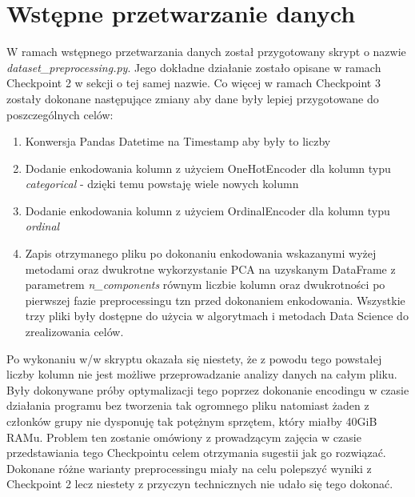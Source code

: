 \documentclass{classrep}
\begin{document}
    \section{Wstępne przetwarzanie danych} {
        W ramach wstępnego przetwarzania danych został przygotowany skrypt o nazwie
        \textit{dataset\_preprocessing.py}. Jego dokładne działanie zostało opisane w
        ramach Checkpoint 2 w sekcji o tej samej nazwie. Co więcej w ramach Checkpoint 3 zostały dokonane następujące zmiany aby dane były lepiej przygotowane do poszczególnych celów:
        \begin{enumerate}
            \item Konwersja Pandas Datetime na Timestamp aby były to liczby
            \item Dodanie enkodowania kolumn z użyciem OneHotEncoder dla kolumn typu \emph{categorical} - dzięki temu powstaję wiele nowych kolumn
            \item Dodanie enkodowania kolumn z użyciem OrdinalEncoder dla kolumn typu \emph{ordinal}
            \item Zapis otrzymanego pliku po dokonaniu enkodowania wskazanymi wyżej metodami oraz dwukrotne wykorzystanie PCA na uzyskanym DataFrame z parametrem \emph{n\_components} równym liczbie kolumn oraz dwukrotności po pierwszej fazie preprocessingu tzn przed dokonaniem enkodowania. Wszystkie trzy pliki były dostępne do użycia w algorytmach i metodach Data Science do zrealizowania celów.
        \end{enumerate}
        Po wykonaniu w/w skryptu okazała się niestety, że z powodu tego powstałej liczby kolumn nie jest możliwe przeprowadzanie analizy danych na całym pliku. Były dokonywane próby optymalizacji tego poprzez dokonanie encodingu w czasie działania programu bez tworzenia tak ogromnego pliku natomiast żaden z członków grupy nie dysponuję tak potężnym sprzętem, który miałby 40GiB RAMu. Problem ten zostanie omówiony z prowadzącym zajęcia w czasie przedstawiania tego Checkpointu celem otrzymania sugestii jak go rozwiązać. Dokonane różne warianty preprocessingu miały na celu polepszyć wyniki z Checkpoint 2 lecz niestety z przyczyn technicznych nie udało się tego dokonać.
    }
\end{document}
